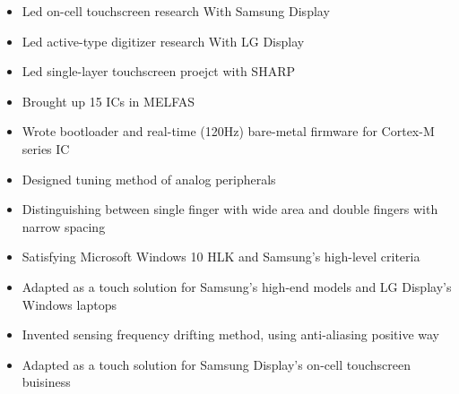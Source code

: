 \documentclass[10pt,a4paper,ragged2e,withhyper]{altacv}
\begin{document}
\begin{paracol}{2}
  \medskip
 
  \begin{itemize}
    \item Led on-cell touchscreen research With Samsung Display
    \item Led active-type digitizer research With LG Display
    \item Led single-layer touchscreen proejct with SHARP
  \end{itemize}

  \smallskip

  \begin{itemize}
    \item Brought up 15 ICs in MELFAS
    \item Wrote bootloader and real-time (120Hz) bare-metal firmware for Cortex-M series IC
    \item Designed tuning method of analog peripherals
  \end{itemize}




  \begin{itemize}
  \item Distinguishing between single finger with wide area and double fingers with narrow spacing
  \item Satisfying Microsoft Windows 10 HLK and Samsung's high-level criteria
  \item Adapted as a touch solution for Samsung's high-end models and LG Display's Windows laptops 
  \end{itemize}
  \medskip

  \begin{itemize}
  \item Invented sensing frequency drifting method, using anti-aliasing positive way
  \item Adapted as a touch solution for Samsung Display's on-cell touchscreen buisiness
  \end{itemize}
  \medskip


\end{paracol}
\end{document}
